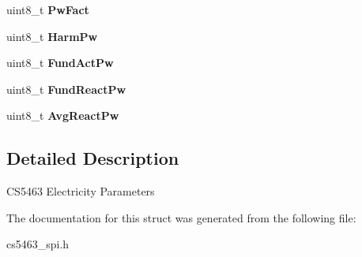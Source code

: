\begin{DoxyCompactItemize}
\item 
\hypertarget{structcs5463ElectricityAttr_a8a6cc5b105e5affe92d3659b286b7ca1}{uint8\-\_\-t {\bfseries Pw\-Fact}}\label{structcs5463ElectricityAttr_a8a6cc5b105e5affe92d3659b286b7ca1}

\item 
\hypertarget{structcs5463ElectricityAttr_ad8b26c13af4ddbde7f01735154729ad6}{uint8\-\_\-t {\bfseries Harm\-Pw}}\label{structcs5463ElectricityAttr_ad8b26c13af4ddbde7f01735154729ad6}

\item 
\hypertarget{structcs5463ElectricityAttr_ab818b1c5499186e2a989abf66555f3de}{uint8\-\_\-t {\bfseries Fund\-Act\-Pw}}\label{structcs5463ElectricityAttr_ab818b1c5499186e2a989abf66555f3de}

\item 
\hypertarget{structcs5463ElectricityAttr_a3019dbd904e7878e1873723affd3a039}{uint8\-\_\-t {\bfseries Fund\-React\-Pw}}\label{structcs5463ElectricityAttr_a3019dbd904e7878e1873723affd3a039}

\item 
\hypertarget{structcs5463ElectricityAttr_a6c8d936073ebed4360a586b59deab251}{uint8\-\_\-t {\bfseries Avg\-React\-Pw}}\label{structcs5463ElectricityAttr_a6c8d936073ebed4360a586b59deab251}

\end{DoxyCompactItemize}


\subsection{Detailed Description}
C\-S5463 Electricity Parameters 

The documentation for this struct was generated from the following file\-:\begin{DoxyCompactItemize}
\item 
cs5463\-\_\-spi.\-h\end{DoxyCompactItemize}
